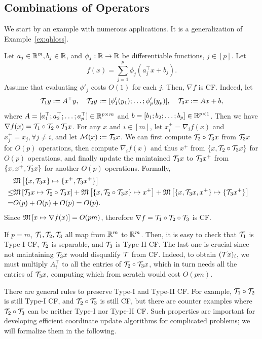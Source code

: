 \subsection{Combinations of Operators}\label{sc:comb}
We start by an example with numerous applications. It is a generalization of Example~\ref{ex:qhloss}.
\begin{example}\label{exp:log-grad} Let $a_j\in \mathbb{R}^m, b_j\in \mathbb{R}$, and $\phi_j:\mathbb{R}\to \mathbb{R}$ be differentiable functions, $j \in [p]$. Let $$f(x)=\sum_{j=1}^p \phi_j(a_j^\top x +b_j).$$ Assume that evaluating $\phi'_j$ costs $O(1)$ for each $j$. Then, $\nabla f$ is CF. Indeed, let $${\mathcal{T}}_1 y:=A^\top y,\quad {\mathcal{T}}_2 y := [\phi_1'(y_1);\ldots;\phi_p'(y_p)], \quad {\mathcal{T}}_3 x := Ax+b,$$
where $A=[a_1^\top; a_2^\top; \ldots; a_p^\top]\in \mathbb{R}^{p\times m}$ and $b=[b_1;b_2;\ldots;b_p]\in\mathbb{R}^{p\times 1}$. Then we have $\nabla f(x)= {\mathcal{T}}_1\circ{\mathcal{T}}_2\circ{\mathcal{T}}_3 x$. For any $x$ and $i\in[m]$, let $x^+_i=\nabla_i f(x)$ and $x^+_j=x_j,\forall j\neq i$, and let ${\mathcal{M}}(x):={\mathcal{T}}_3 x$. We can first compute ${\mathcal{T}}_2\circ{\mathcal{T}}_3 x$ from ${\mathcal{T}}_3 x$ for $O(p)$ operations, then compute $\nabla_i f(x)$ and thus $x^+$ from $\{x, {\mathcal{T}}_2\circ{\mathcal{T}}_3 x\}$ for  $O(p)$ operations, and finally update the maintained ${\mathcal{T}}_3 x$ to ${\mathcal{T}}_3 x^+$ from $\{x, x^+,{\mathcal{T}}_3 x\}$ for another $O(p)$ operations. Formally,
\begin{align*}
&\nops{\{x,\cT_3 x\}}{\{x^+, \cT_3x^+\}}\cr
\le& \nops{\cT_3x}{\cT_2\circ\cT_3 x}+\nops {\{x,\cT_2\circ\cT_3 x\}}{x^+}+\nops{\{x,\cT_3 x, x^+\}}{\{\cT_3x^+\}}\cr
=& O(p) + O(p) +O(p)=O(p).\nonumber
\end{align*}
Since $\mathfrak{M}\left[{x}\mapsto {\nabla f(x)}\right]=O(pm)$, therefore
$\nabla f= {\mathcal{T}}_1\circ{\mathcal{T}}_2\circ{\mathcal{T}}_3$ is CF.

If $p=m$, ${\mathcal{T}}_1,{\mathcal{T}}_2,{\mathcal{T}}_3$ all map from $\mathbb{R}^m$ to $\mathbb{R}^m$. Then, it is easy to check that ${\mathcal{T}}_1$ is Type-I CF, ${\mathcal{T}}_2$ is separable, and ${\mathcal{T}}_3$ is Type-II CF. The last one is crucial since not maintaining ${\mathcal{T}}_3 x$ would disqualify ${\mathcal{T}}$ from CF. Indeed, to obtain $({\mathcal{T}} x)_i$, we must multiply $A_i^\top$ to all the entries of ${\mathcal{T}}_2\circ{\mathcal{T}}_3 x$, which in turn needs all the entries of ${\mathcal{T}}_3 x$, computing which from scratch would cost $O(pm)$.

There are general rules to preserve Type-I and Type-II CF. For example, ${\mathcal{T}}_1\circ {\mathcal{T}}_2$ is still Type-I CF, and ${\mathcal{T}}_2\circ{\mathcal{T}}_3$ is still CF, but there are counter examples where  ${\mathcal{T}}_2\circ{\mathcal{T}}_3$  can be neither Type-I nor Type-II CF. Such properties are important for developing efficient coordinate update algorithms for complicated problems; we will formalize them in the following.
\end{example}


